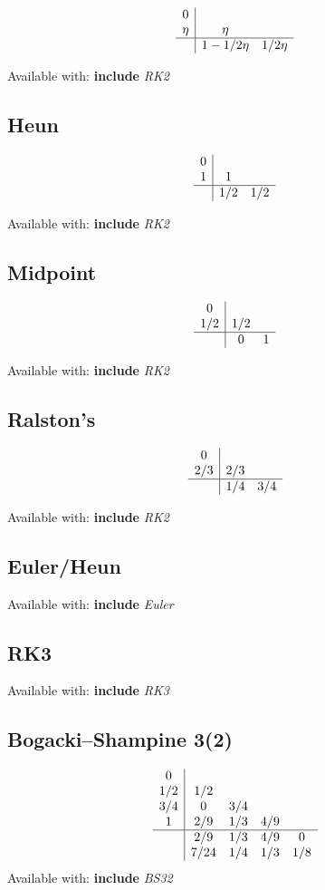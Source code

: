 \documentclass[letterpaper,10pt]{book}
\newcommand{\srcas}[1]{Available with: \textbf{include} \textlangle{}\textit{#1}\textrangle{}}
\begin{document}
	\[
	  \begin{array}{c|cc}
	    0 & & \\
	    \eta & \eta & \\
	    \hline
	    & 1-1/2\eta & 1/2\eta
	  \end{array}
	\]

	\srcas{RK2}
	    
      \subsection{Heun}
	\[
	  \begin{array}{c|cc}
	    0 & & \\
	    1 & 1 & \\
	    \hline
	    & 1/2 & 1/2
	  \end{array}
	\]

	\srcas{RK2}
	
      \subsection{Midpoint}
	\[
	  \begin{array}{c|cc}
	    0 & & \\
	    1/2 & 1/2 & \\
	    \hline
	    & 0 & 1
	  \end{array}
	\]    

	\srcas{RK2}
	
      \subsection{Ralston's}
	\[
	  \begin{array}{c|cc}
	    0 & & \\
	    2/3 & 2/3 & \\
	    \hline
	    & 1/4 & 3/4
	  \end{array}
	\]      

	\srcas{RK2}

      \subsection{Euler/Heun}
    
    	\srcas{Euler}

      \subsection{RK3}
	\srcas{RK3}
    
    
      \subsection{Bogacki–Shampine 3(2)}
	\[
	  \begin{array}{c|cccc}
	    0 & & & &\\
	    1/2 & 1/2 & & &\\
	    3/4 & 0 & 3/4 & &\\	    
	    1 & 2/9 & 1/3 & 4/9 &\\	    
	    \hline
	    & 2/9 & 1/3 & 4/9 & 0\\
	    & 7/24 & 1/4 & 1/3 & 1/8\\
	  \end{array}
	\]    
    	\srcas{BS32}
\end{document}
